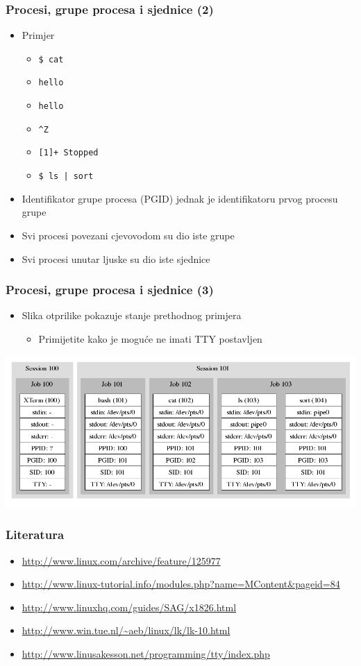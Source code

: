 \documentclass[table,usenames,dvipsnames]{beamer}
\newcommand{\shell}[1]{\texttt{#1}}
\begin{document}
\begin{frame}[t]
\frametitle{Procesi, grupe procesa i sjednice (2)}
\begin{itemize}
  \item Primjer
  \begin{itemize}
    \item[] \shell{\$ cat}
    \item[] \shell{hello}
    \item[] \shell{hello}
    \item[] \shell{\textasciicircum{}Z}
    \item[] \shell{[1]+ Stopped}
    \item[] \shell{\$ ls | sort}
  \end{itemize}
  \item Identifikator grupe procesa (PGID) jednak je identifikatoru prvog 
        procesu grupe 
  \item Svi procesi povezani cjevovodom su dio iste grupe
  \item Svi procesi unutar ljuske su dio iste sjednice
\end{itemize}
\end{frame}

\begin{frame}[t]
\frametitle{Procesi, grupe procesa i sjednice (3)}
\begin{itemize}
  \item Slika otprilike pokazuje stanje prethodnog primjera
  \begin{itemize}
    \item Primijetite kako je moguće ne imati TTY postavljen
  \end{itemize}
\end{itemize}
    \flushleft
    \includegraphics[scale=0.35]{process.png}
\end{frame}

\begin{frame}[t]
\frametitle{Literatura}
\begin{itemize}
  \item \url{http://www.linux.com/archive/feature/125977}
  \item \url{http://www.linux-tutorial.info/modules.php?name=MContent&pageid=84}
  \item \url{http://www.linuxhq.com/guides/SAG/x1826.html}
  \item \url{http://www.win.tue.nl/~aeb/linux/lk/lk-10.html}
  \item \url{http://www.linusakesson.net/programming/tty/index.php}
\end{itemize}
\end{frame}
\end{document}
